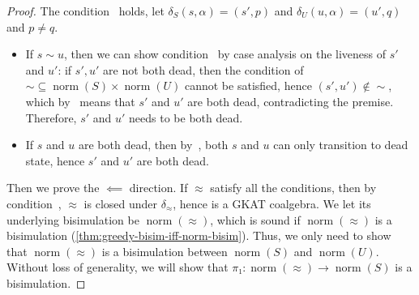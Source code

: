 \documentclass[conference]{IEEEtran}
\DeclareMathOperator{\norm}{\mathrm{norm}}
\begin{document}
\begin{proof}
    The condition~ holds, let \(δ_S(s, α) = (s', p)\) and \(δ_U(u, α) = (u', q)\) and \(p ≠ q\). 
    \begin{itemize}
        \item If \(s ∼ u\), then we can show condition~ by case analysis on the liveness of \(s'\) and \(u'\):
        if \(s', u'\) are not both dead, then the condition of \({∼} ⊆ \norm(S) × \norm(U)\) cannot be satisfied, hence \((s', u') ∉ {∼}\), which by~ means that \(s'\) and \(u'\) are both dead, contradicting the premise.
        Therefore, \(s'\) and \(u'\) needs to be both dead.
        \item If \(s\) and \(u\) are both dead, then by~, both \(s\) and \(u\) can only transition to dead state, hence \(s'\) and \(u'\) are both dead.
    \end{itemize}

    Then we prove the \(⟸\) direction.
    If \(≈\) satisfy all the conditions, then by condition~, \(≈\) is closed under \(δ_≈\), hence is a GKAT coalgebra.
    We let its underlying bisimulation be \(\norm(≈)\), which is sound if \(\norm(≈)\) is a bisimulation (\cref{thm:greedy-bisim-iff-norm-bisim}).
    Thus, we only need to show that \(\norm(≈)\) is a bisimulation between \(\norm(S)\) and \(\norm(U)\). Without loss of generality, we will show that \(π₁: \norm(≈) → \norm(S)\) is a bisimulation.


\end{proof}
\end{document}
